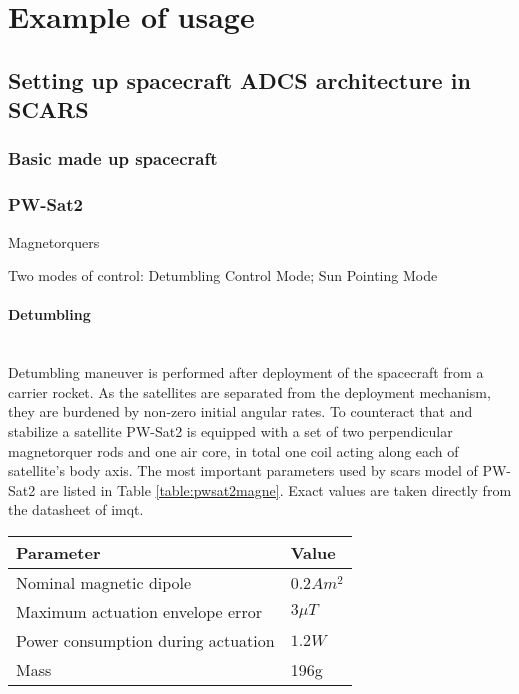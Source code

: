 \section{Example of usage}\label{sec:examples}

\subsection{Setting up spacecraft ADCS architecture in SCARS}

\subsubsection{Basic made up spacecraft}

\subsubsection{PW-Sat2}
    Magnetorquers

    Two modes of control: Detumbling Control Mode; Sun Pointing Mode

    \paragraph*{Detumbling}\hspace{0pt} \\
        Detumbling maneuver is performed after deployment of the spacecraft from a carrier rocket. As the satellites are separated from the deployment mechanism, they are burdened by non-zero initial angular rates. To counteract that and stabilize a satellite PW-Sat2 is equipped with a set of two perpendicular magnetorquer rods and one air core, in total one coil acting along each of satellite's body axis. The most important parameters used by \ac{scars} model of PW-Sat2 are listed in Table \ref{table:pwsat2magne}.\cite{pwsat2adcs} Exact values are taken directly from the datasheet of \ac{imqt}.\cite{imqt-datasheet}

        \begin{center}    
            \begin{tabular}{l l}
                \textbf{Parameter} & \textbf{Value} \\ \hline
                Nominal magnetic dipole & $0.2 Am^2$ \\
                Maximum actuation envelope error & $3\mu T$ \\
                Power consumption during actuation & $1.2W$ \\
                Mass & 196g
            \end{tabular}
        \end{center}\label{table:pwsat2magne}


